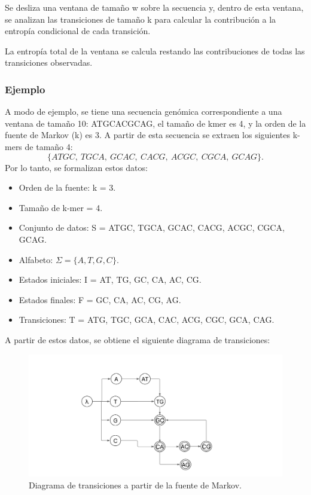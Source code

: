 \documentclass[11pt,spanish,listoffigures,listoftables]{tfgetsinf}
\begin{document}
Se desliza una ventana de tamaño w sobre la secuencia y, dentro de esta ventana, se analizan las transiciones de tamaño k para calcular la contribución a la entropía condicional de cada transición.

La entropía total de la ventana se calcula restando las contribuciones de todas las transiciones observadas.

\subsubsection{Ejemplo}

A modo de ejemplo, se tiene una secuencia genómica correspondiente a una ventana de tamaño 10: ATGCACGCAG, el tamaño de kmer es 4, y la orden de la fuente de Markov (k) es 3. A partir de esta secuencia se extraen los siguientes k-mers de tamaño 4: 
\[
\{ATGC,\ TGCA,\ GCAC,\ CACG,\ ACGC,\ CGCA,\ GCAG\}.
\]
Por lo tanto, se formalizan estos datos:

\begin{itemize}
   \item Orden de la fuente: k = 3.
   \item Tamaño de k-mer = 4.
   \item Conjunto de datos: S = {ATGC, TGCA, GCAC, CACG, ACGC, CGCA, GCAG}.
   \item Alfabeto: \( \Sigma = \{A, T, G, C\} \).
   \item Estados iniciales: I = {AT, TG, GC, CA, AC, CG}.
   \item Estados finales: F = {GC, CA, AC, CG, AG}.
   \item Transiciones: T = {ATG, TGC, GCA, CAC, ACG, CGC, GCA, CAG}.
\end{itemize}

A partir de estos datos, se obtiene el siguiente diagrama de transiciones:

\begin{figure}[H]
   \centering
   \includegraphics[width=1.1\textwidth]{automataMarkov.png}
   \caption{Diagrama de transiciones a partir de la fuente de Markov.}
   \label{fig:etiqueta_opcional114}
\end{figure}
\end{document}
